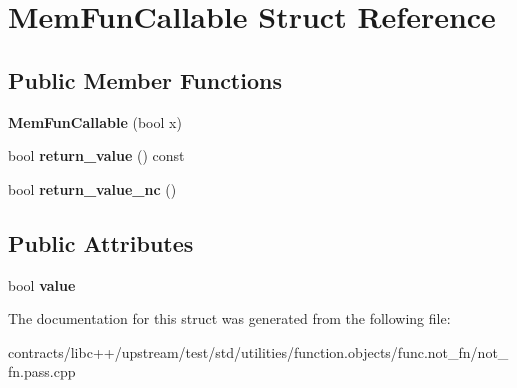 \hypertarget{struct_mem_fun_callable}{}\section{Mem\+Fun\+Callable Struct Reference}
\label{struct_mem_fun_callable}
\subsection*{Public Member Functions}
\begin{DoxyCompactItemize}
\item 
\mbox{\label{struct_mem_fun_callable_a95fe32b97c9abd20776467c511da2cce}} 
{\bfseries Mem\+Fun\+Callable} (bool x)
\item 
\mbox{\label{struct_mem_fun_callable_a3f06706be9a86ba193bcc0748e2dba9d}} 
bool {\bfseries return\+\_\+value} () const
\item 
\mbox{\label{struct_mem_fun_callable_a3842a162be06933e3ce2da835ebe46f7}} 
bool {\bfseries return\+\_\+value\+\_\+nc} ()
\end{DoxyCompactItemize}
\subsection*{Public Attributes}
\begin{DoxyCompactItemize}
\item 
\mbox{\label{struct_mem_fun_callable_adaa028fc4aec377e8842ce8ca28bf823}} 
bool {\bfseries value}
\end{DoxyCompactItemize}


The documentation for this struct was generated from the following file\+:\begin{DoxyCompactItemize}
\item 
contracts/libc++/upstream/test/std/utilities/function.\+objects/func.\+not\+\_\+fn/not\+\_\+fn.\+pass.\+cpp\end{DoxyCompactItemize}
